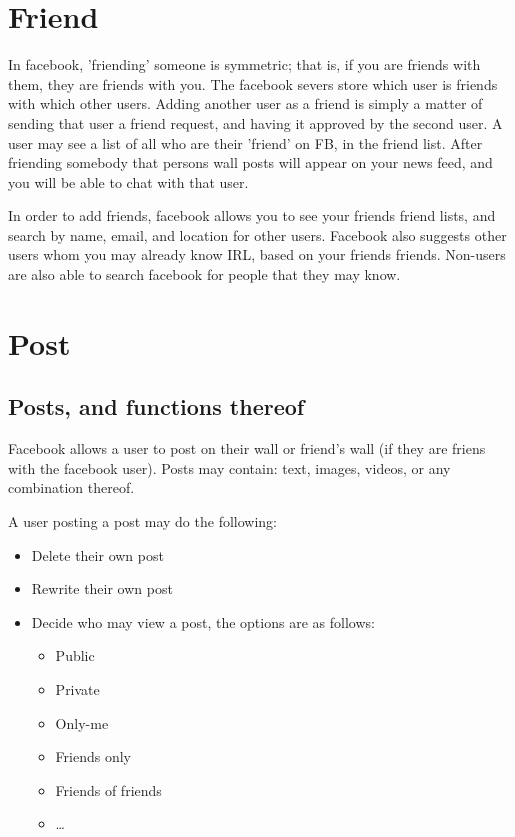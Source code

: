 \section{Friend}
In facebook, 'friending' someone is symmetric; that is, if you are friends with
them, they are friends with you. The facebook severs store which user is friends
with which other users. Adding another user as a friend is simply a matter of
sending that user a friend request, and having it approved by the second user. A
user may see a list of all who are their 'friend' on FB, in the friend list.
After friending somebody that persons wall posts will appear on your news feed,
and you will be able to chat with that user.

In order to add friends, facebook allows you to see your friends friend lists,
and search by name, email, and location for other users. Facebook also suggests
other users whom you may already know IRL, based on your friends friends.
Non-users are also able to search facebook for people that they may know.

\section{Post}
\subsection{Posts, and functions thereof}
Facebook allows a user to post on their wall or friend's wall (if they are
friens with the facebook user). Posts may contain: text, images, videos, or any
combination thereof.

A user posting a post may do the following:
\begin{itemize}
\item Delete their own post
\item Rewrite their own post
\item Decide who may view a post, the options are as follows:
    \begin{itemize}
    \item Public
    \item Private
    \item Only-me
    \item Friends only
    \item Friends of friends
    \item \ldots {}
    \end{itemize}
\end{itemize}

